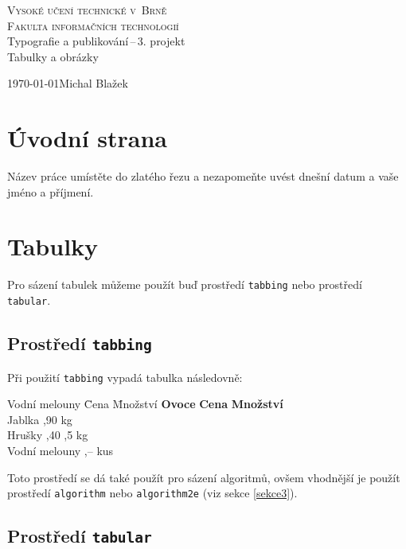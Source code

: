 \documentclass[a4paper, 11pt]{article}
\begin{document}
\begin{titlepage}
\begin{center}
    \Huge
    \textsc{Vysoké učení technické v~Brně\\
    \huge{Fakulta informačních technologií}}\\
    \LARGE{Typografie a publikování\,--\,3. projekt}\\
    \Huge{Tabulky a obrázky}\\
\end{center}
{\Large \today \hfill Michal Blažek}
\end{titlepage}

\section{Úvodní strana}

Název práce umístěte do zlatého řezu a nezapomeňte uvést dnešní datum a vaše jméno a příjmení.

\section{Tabulky}

Pro sázení tabulek můžeme použít buď prostředí \texttt{tabbing} nebo prostředí \texttt{tabular}.

\subsection{Prostředí \texttt{tabbing}}

Při použití \texttt{tabbing} vypadá tabulka následovně:

\begin{tabbing}
    Vodní melouny \quad \= Cena \quad \= Množství \kill
    \textbf{Ovoce} \> \textbf{Cena} \> \textbf{Množství} \\
    Jablka ,90  kg \\
    Hrušky ,40 ,5 kg \\
    Vodní melouny ,--  kus \\
\end{tabbing}
Toto prostředí se dá také použít pro sázení algoritmů, ovšem vhodnější je použít prostředí \texttt{algorithm} nebo \texttt{algorithm2e} (viz sekce \ref{sekce3}).

\subsection{Prostředí \texttt{tabular}}
\end{document}
